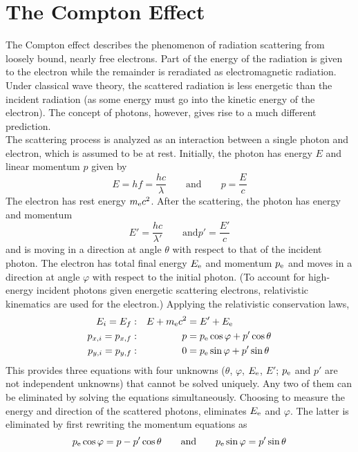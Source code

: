 \documentclass{subfiles}
\begin{document}
	\section{The Compton Effect}
		The Compton effect describes the phenomenon of radiation scattering from loosely bound, nearly free electrons. Part of the energy of the radiation is given to the electron while the remainder is reradiated as electromagnetic radiation. Under classical wave theory, the scattered radiation is less energetic than the incident radiation (as some energy must go into the kinetic energy of the electron). The concept of photons, however, gives rise to a much different prediction. \\
			The scattering process is analyzed as an interaction between a single photon and electron, which is assumed to be at rest. Initially, the photon has energy \(E\) and linear momentum \(p\) given by
			\[E = hf = \frac{hc}{\lambda} \qquad \text{and} \qquad p = \frac{E}{c}\]
			The electron has rest energy \(m_{\text{e}}c^2\). After the scattering, the photon has energy and momentum 
			\[E' = \frac{hc}{\lambda'} \qquad \text{and} p' = \frac{E'}{c}\]
			and is moving in a direction at angle \(\theta\) with respect to that of the incident photon. The electron has total final energy \(E_{\text{e}}\) and momentum \(p_{\text{e}}\) and moves in a direction at angle \(\varphi\) with respect to the initial photon. (To account for high-energy incident photons given energetic scattering electrons, relativistic kinematics are used for the electron.) Applying the relativistic conservation laws,
			\begin{align*}
				E_i = E_f &: &
					E + m_{\text{e}}c^2 &= E' + E_{\text{e}} \\
				p_{x, i} = p_{x, f} &: &
					p &= p_{\text{e}}\cos\varphi + p'\cos\theta \\
				p_{y, i} = p_{y, f} &: &
					0 &= p_{\text{e}}\sin\varphi + p'\sin\theta	
			\end{align*}
			This provides three equations with four unknowns (\(\theta\), \(\varphi\), \(E_{\text{e}}\), \(E'\); \(p_{\text{e}}\) and \(p'\) are not independent unknowns) that cannot be solved uniquely. Any two of them can be eliminated by solving the equations simultaneously. Choosing to measure the energy and direction of the scattered photons, eliminates \(E_{\text{e}}\) and \(\varphi\). The latter is eliminated by first rewriting the momentum equations as
				\[
					p_{\text{e}}\cos\varphi = p - p'\cos\theta \qquad \text{and} \qquad
					p_{\text{e}}\sin\varphi = p'\sin\theta
				\]
\end{document}
